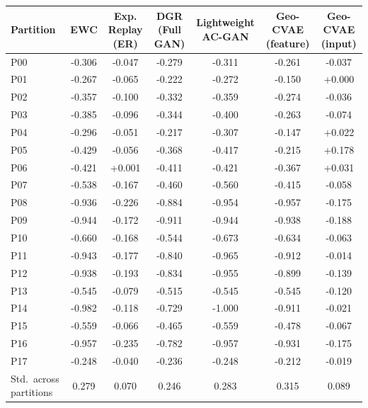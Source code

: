 \begin{tabular}{lcccccc}
\toprule
\textbf{Partition} & \textbf{EWC} & \textbf{Exp. Replay (ER)} & \textbf{DGR (Full GAN)} & \textbf{Lightweight AC-GAN} & \textbf{Geo-CVAE (feature)} & \textbf{Geo-CVAE (input)} \\
\midrule
P00 & -0.306 & -0.047 & -0.279 & -0.311 & -0.261 & -0.037 \\
P01 & -0.267 & -0.065 & -0.222 & -0.272 & -0.150 & +0.000 \\
P02 & -0.357 & -0.100 & -0.332 & -0.359 & -0.274 & -0.036 \\
P03 & -0.385 & -0.096 & -0.344 & -0.400 & -0.263 & -0.074 \\
P04 & -0.296 & -0.051 & -0.217 & -0.307 & -0.147 & +0.022 \\
P05 & -0.429 & -0.056 & -0.368 & -0.417 & -0.215 & +0.178 \\
P06 & -0.421 & +0.001 & -0.411 & -0.421 & -0.367 & +0.031 \\
P07 & -0.538 & -0.167 & -0.460 & -0.560 & -0.415 & -0.058 \\
P08 & -0.936 & -0.226 & -0.884 & -0.954 & -0.957 & -0.175 \\
P09 & -0.944 & -0.172 & -0.911 & -0.944 & -0.938 & -0.188 \\
P10 & -0.660 & -0.168 & -0.544 & -0.673 & -0.634 & -0.063 \\
P11 & -0.943 & -0.177 & -0.840 & -0.965 & -0.912 & -0.014 \\
P12 & -0.938 & -0.193 & -0.834 & -0.955 & -0.899 & -0.139 \\
P13 & -0.545 & -0.079 & -0.515 & -0.545 & -0.545 & -0.120 \\
P14 & -0.982 & -0.118 & -0.729 & -1.000 & -0.911 & -0.021 \\
P15 & -0.559 & -0.066 & -0.465 & -0.559 & -0.478 & -0.067 \\
P16 & -0.957 & -0.235 & -0.782 & -0.957 & -0.931 & -0.175 \\
P17 & -0.248 & -0.040 & -0.236 & -0.248 & -0.212 & -0.019 \\
\midrule
Std.\ across partitions & 0.279 & 0.070 & 0.246 & 0.283 & 0.315 & 0.089 \\
\bottomrule
\end{tabular}